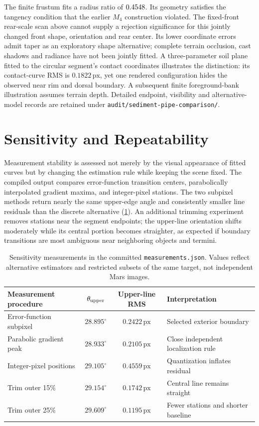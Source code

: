 \documentclass[11pt,letterpaper]{article}
\newcommand{\px}{\,\mathrm{px}}
\newcommand{\sourcepath}[1]{\nolinkurl{#1}}
\begin{document}
The finite frustum fits a radius ratio of $0.4548$. Its geometry satisfies the tangency condition that the earlier $M_4$ construction violated. The fixed-front rear-scale scan above cannot supply a rejection significance for this jointly changed front shape, orientation and rear center. Its lower coordinate errors admit taper as an exploratory shape alternative; complete terrain occlusion, cast shadows and radiance have not been jointly fitted. A three-parameter soil plane fitted to the circular segment's contact coordinates illustrates the distinction: its contact-curve RMS is $0.1822\px$, yet one rendered configuration hides the observed near rim and dorsal boundary. A subsequent finite foreground-bank illustration assumes terrain depth. Detailed endpoint, visibility and alternative-model records are retained under \sourcepath{audit/sediment-pipe-comparison/}.

\section{Sensitivity and Repeatability}
\label{sec:sensitivity}

Measurement stability is assessed not merely by the visual appearance of fitted curves but by changing the estimation rule while keeping the scene fixed. The compiled output compares error-function transition centers, parabolically interpolated gradient maxima, and integer-pixel stations. The two subpixel methods return nearly the same upper-edge angle and consistently smaller line residuals than the discrete alternative (\cref{tab:sens}). An additional trimming experiment removes stations near the segment endpoints; the upper-line orientation shifts moderately while its central portion becomes straighter, as expected if boundary transitions are most ambiguous near neighboring objects and termini.

\begin{table}[ht]
\centering\small
\caption{Sensitivity measurements in the committed \sourcepath{measurements.json}. Values reflect alternative estimators and restricted subsets of the same target, not independent Mars images.}
\label{tab:sens}
\begin{tabularx}{\linewidth}{@{}l c c X@{}}
\toprule
\textbf{Measurement procedure} & \(\theta_{\rm upper}\) & \textbf{Upper-line RMS} & \textbf{Interpretation} \\
\midrule
Error-function subpixel & \(28.895^\circ\) & \(0.2422\px\) & Selected exterior boundary \\
Parabolic gradient peak & \(28.933^\circ\) & \(0.2105\px\) & Close independent localization rule \\
Integer-pixel positions & \(29.105^\circ\) & \(0.4559\px\) & Quantization inflates residual \\
Trim outer 15\% & \(29.154^\circ\) & \(0.1742\px\) & Central line remains straight \\
Trim outer 25\% & \(29.609^\circ\) & \(0.1195\px\) & Fewer stations and shorter baseline \\
\bottomrule
\end{tabularx}
\end{table}
\end{document}
